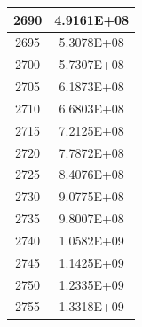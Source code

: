 \documentclass[a4paper]{article}
\begin{document}
\begin{tabular}{|c|c|}
		\hline
		2690 & 4.9161E+08 \\
		\hline
		2695 & 5.3078E+08 \\
		\hline
		2700 & 5.7307E+08 \\
		\hline
		2705 & 6.1873E+08 \\
		\hline
		2710 & 6.6803E+08 \\
		\hline
		2715 & 7.2125E+08 \\
		\hline
		2720 & 7.7872E+08 \\
		\hline
		2725 & 8.4076E+08 \\
		\hline
		2730 & 9.0775E+08 \\
		\hline
		2735 & 9.8007E+08 \\
		\hline
		2740 & 1.0582E+09 \\
		\hline
		2745 & 1.1425E+09 \\
		\hline
		2750 & 1.2335E+09 \\
		\hline
		2755 & 1.3318E+09 \\
		\hline
	\end{tabular}
	\hfill
\end{document}
